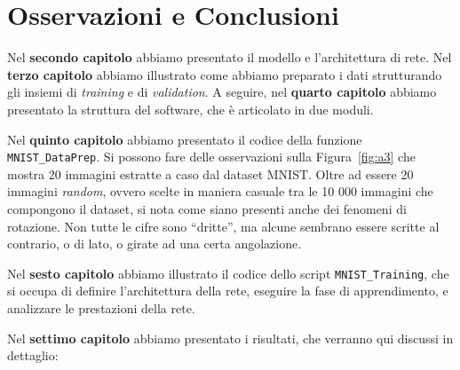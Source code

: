 \documentclass[a4paper,12pt]{article}
\begin{document}
\newpage
\section{Osservazioni e Conclusioni} %

Nel \textbf{secondo capitolo} abbiamo presentato il modello e l'architettura di rete. Nel \textbf{terzo capitolo} abbiamo illustrato come abbiamo preparato i dati strutturando gli insiemi di \emph{training} e di \emph{validation}. A seguire, nel \textbf{quarto capitolo} abbiamo presentato la struttura del software, che è articolato in due moduli.\medskip

Nel \textbf{quinto capitolo} abbiamo presentato il codice della funzione \texttt{MNIST\_DataPrep}. Si possono fare delle osservazioni sulla Figura~\vref{fig:a3} che mostra 20 immagini estratte a caso dal dataset MNIST. Oltre ad essere 20 immagini \emph{random}, ovvero scelte in maniera casuale tra le 10 000 immagini che compongono il dataset, si nota come siano presenti anche dei fenomeni di rotazione. Non tutte le cifre sono ``dritte'', ma alcune sembrano essere scritte al contrario, o di lato, o girate ad una certa angolazione.\medskip

Nel \textbf{sesto capitolo} abbiamo illustrato il codice dello script \texttt{MNIST\_Training}, che si occupa di definire l'architettura della rete, eseguire la fase di apprendimento, e analizzare le prestazioni della rete.\medskip

Nel \textbf{settimo capitolo} abbiamo presentato i risultati, che verranno qui discussi in dettaglio:
\end{document}
